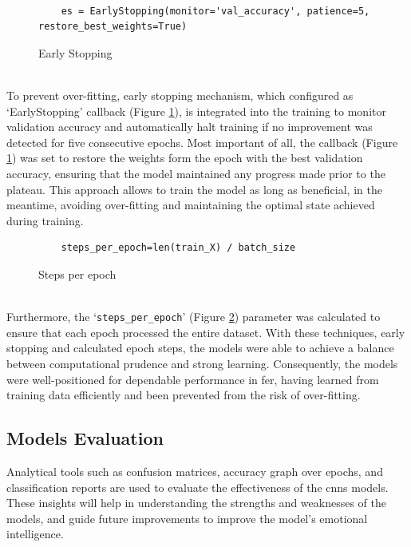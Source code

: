 \\
\begin{figure}[h!] 
    \centering
\begin{verbatim}
    es = EarlyStopping(monitor='val_accuracy', patience=5, restore_best_weights=True)
\end{verbatim}
    \caption{Early Stopping}
    \label{fig:earlystopping}
\end{figure}
\\
\indent To prevent over-fitting, early stopping mechanism, which configured as `EarlyStopping' callback (Figure \ref{fig:earlystopping}), is integrated into the training to monitor validation accuracy and automatically halt training if no improvement was detected for five consecutive epochs.
Most important of all, the callback (Figure \ref{fig:earlystopping}) was set to restore the weights form the epoch with the best validation accuracy, ensuring that the model maintained any progress made prior to the plateau.
This approach allows to train the model as long as beneficial, in the meantime, avoiding over-fitting and maintaining the optimal state achieved during training.
\\
\begin{figure}[h!] 
    \centering
\begin{verbatim}
    steps_per_epoch=len(train_X) / batch_size
\end{verbatim}
    \caption{Steps per epoch}
    \label{fig:steps_per_epoch}
\end{figure}
\\
\indent Furthermore, the `\texttt{steps\_per\_epoch}' (Figure \ref{fig:steps_per_epoch}) parameter was calculated to ensure that each epoch processed the entire dataset.
With these techniques, early stopping and calculated epoch steps, the models were able to achieve a balance between computational prudence and strong learning.
Consequently, the models were well-positioned for dependable performance in \gls{fer}, having learned from training data efficiently and been prevented from the risk of over-fitting. 
\subsection{Models Evaluation}
Analytical tools such as confusion matrices, accuracy graph over epochs, and classification reports are used to evaluate the effectiveness of the \gls{cnns} models. 
These insights will help in understanding the strengths and weaknesses of the models, and guide future improvements to improve the model's emotional intelligence.

